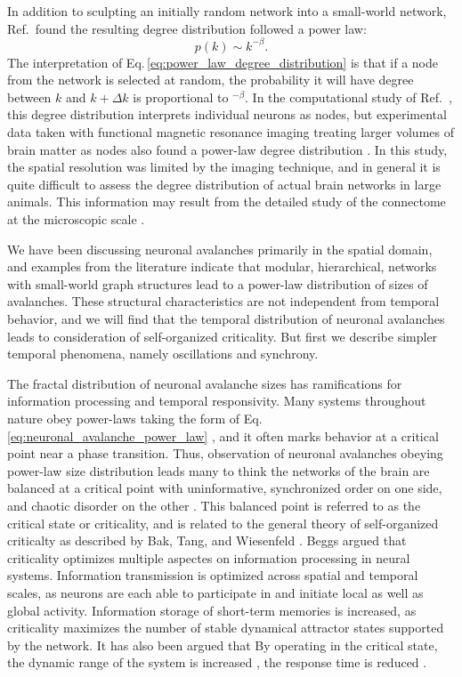 \documentclass[twocolumn]{article}
\newcommand{\onlinecite}[1]{\hspace{-1 ex} \nocite{#1}\citenum{#1}}
\begin{document}
In addition to sculpting an initially random network into a small-world network, Ref.\,\onlinecite{shki2006} found the resulting degree distribution followed a power law:
\begin{equation}
\label{eq:power_law_degree_distribution}
p(k) \sim k^{-\beta}.
\end{equation}
The interpretation of Eq.\,\ref{eq:power_law_degree_distribution} is that if a node from the network is selected at random, the probability it will have degree between $k$ and $k+\Delta k$ is proportional to $^{-\beta}$. In the computational study of Ref.\,\onlinecite{shki2006}, this degree distribution interprets individual neurons as nodes, but experimental data taken with functional magnetic resonance imaging treating larger volumes of brain matter as nodes also found a power-law degree distribution \cite{egch2005}. In this study, the spatial resolution was limited by the imaging technique, and in general it is quite difficult to assess the degree distribution of actual brain networks in large animals. This information may result from the detailed study of the connectome at the microscopic scale \cite{http://www.humanconnectomeproject.org/}.
   
We have been discussing neuronal avalanches primarily in the spatial domain, and examples from the literature indicate that modular, hierarchical, networks with small-world graph structures lead to a power-law distribution of sizes of avalanches. These structural characteristics are not independent from temporal behavior, and we will find that the temporal distribution of neuronal avalanches leads to consideration of self-organized criticality. But first we describe simpler temporal phenomena, namely oscillations and synchrony.

The fractal distribution of neuronal avalanche sizes has ramifications for information processing and temporal responsivity. Many systems throughout nature obey power-laws taking the form of Eq.\,\ref{eq:neuronal_avalanche_power_law} \cite{ba2005_baks_book,dover_book_on_fractals}, and it often marks behavior at a critical point near a phase transition. Thus, observation of neuronal avalanches obeying power-law size distribution leads many to think the networks of the brain are balanced at a critical point with uninformative, synchronized order on one side, and chaotic disorder on the other \cite{be2007}. This balanced point is referred to as the critical state or criticality, and is related to the general theory of self-organized criticalty as described by Bak, Tang, and Wiesenfeld \cite{bata1987,bata1988,ba2005}. Beggs argued \cite{be2008} that criticality optimizes multiple aspectes on information processing in neural systems. Information transmission is optimized across spatial and temporal scales, as neurons are each able to participate in and initiate local as well as global activity. Information storage of short-term memories is increased, as criticality maximizes the number of stable dynamical attractor states supported by the network. It has also been argued that  By operating in the critical state, the dynamic range of the system is increased \cite{kico2006,shya2009}, the response time is reduced \cite{}.
\end{document}
